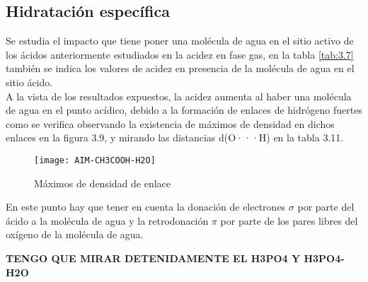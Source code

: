 \subsection{Hidratación específica}
Se estudia el impacto que tiene poner una molécula de agua en el sitio activo de los ácidos anteriormente estudiados en la acidez en fase gas, en la tabla \ref{tab:3.7} también se indica los valores de acidez en presencia de la molécula de agua en el sitio ácido.\\
A la vista de los resultados expuestos, la acidez aumenta al haber una molécula de agua en el punto acídico, debido a la formación de enlaces de hidrógeno fuertes como se verifica observando la existencia de máximos de densidad en dichos enlaces en la figura 3.9, y mirando las distancias d(O···H)  en la tabla 3.11.

\begin{figure} [H]
	\centering
	\texttt{[image: AIM-CH3COOH-H2O]}\cite{AIM}
	\caption{Máximos de densidad de enlace}
\end{figure}

 En este punto hay que tener en cuenta la donación de electrones $\sigma$ por parte del ácido a la molécula de agua y la retrodonación $\pi$ por parte de los pares libres del oxígeno de la molécula de agua.


{\bfseries TENGO QUE MIRAR DETENIDAMENTE EL H3PO4 Y H3PO4-H2O}

